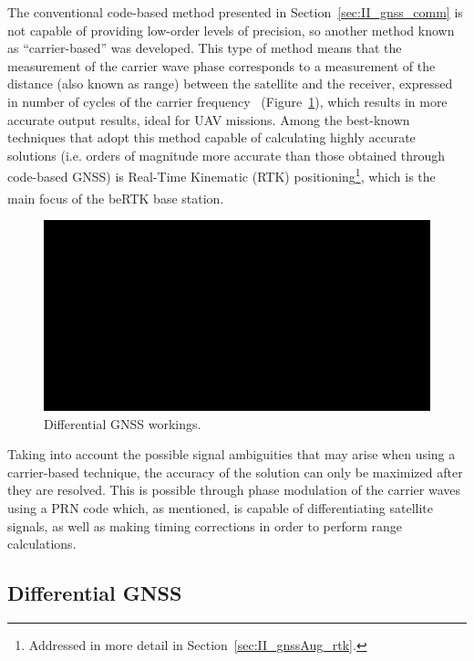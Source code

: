 The conventional code-based method presented in Section~\ref{sec:II_gnss_comm} is not capable of providing low-order levels of precision, so another method known as ``carrier-based'' was developed.
This type of method means that the measurement of the carrier wave phase corresponds to a measurement of the distance (also known as range) between the satellite and the receiver, expressed in number of cycles of the carrier frequency~\cite{inside_GNSS} (Figure~\ref{fig:dgnss_corrections}), which results in more accurate output results, ideal for UAV missions.
Among the best-known techniques that adopt this method capable of calculating highly accurate solutions (i.e. orders of magnitude more accurate than those obtained through code-based GNSS) is Real-Time Kinematic (RTK) positioning\footnote{Addressed in more detail in Section~\ref{sec:II_gnssAug_rtk}.}, which is the main focus of the beRTK\textsuperscript{\textregistered} base station.
\begin{figure}[ht]
	\centering
	\includegraphics[width=1.0\textwidth]{Chapters/Figures/demo.png}
	\caption{Differential GNSS workings.}
	\label{fig:dgnss_corrections}
\end{figure}

Taking into account the possible signal ambiguities that may arise when using a carrier-based technique, the accuracy of the solution can only be maximized after they are resolved. This is possible through phase modulation of the carrier waves using a PRN code which, as mentioned, is capable of differentiating satellite signals, as well as making timing corrections in order to perform range calculations.

\subsection{Differential GNSS}\label{sec:II_gnssAug_dgnss}

